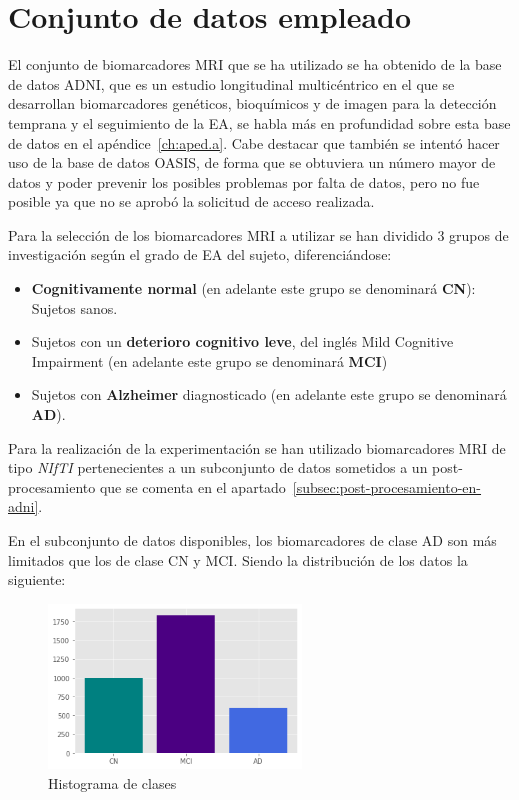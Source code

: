 \section{Conjunto de datos empleado}\label{sec:conjunto-de-datos-empleado}
El conjunto de biomarcadores MRI que se ha utilizado se ha obtenido de la base de datos ADNI, que es un estudio
longitudinal multicéntrico en el que se desarrollan biomarcadores genéticos, bioquímicos y de imagen para la detección
temprana y el seguimiento de la EA, se habla más en profundidad sobre esta base de datos en el
apéndice~\ref{ch:aped.a}.
Cabe destacar que también se intentó hacer uso de la base de datos OASIS, de forma que se obtuviera un número mayor de
datos y poder prevenir los posibles problemas por falta de datos, pero no fue posible ya que no se aprobó la solicitud
de acceso realizada.

Para la selección de los biomarcadores MRI a utilizar se han dividido 3 grupos de investigación según el grado de EA
del sujeto, diferenciándose:
\begin{itemize}
    \item \textbf{Cognitivamente normal} (en adelante este grupo se denominará \textbf{CN}): Sujetos sanos.
    \item Sujetos con un \textbf{deterioro cognitivo leve}, del inglés Mild Cognitive Impairment (en adelante este grupo
    se denominará \textbf{MCI})
    \item Sujetos con \textbf{Alzheimer} diagnosticado (en adelante este grupo se denominará \textbf{AD}). \\
\end{itemize}

Para la realización de la experimentación se han utilizado biomarcadores MRI de tipo \textit{NIfTI} pertenecientes a un
subconjunto de datos sometidos a un post-procesamiento que se comenta en el apartado~\ref{subsec:post-procesamiento-en-adni}.

En el subconjunto de datos disponibles, los biomarcadores de clase \Gls{AD} son más limitados que los de clase \Gls{CN} y \Gls{MCI}.
Siendo la distribución de los datos la siguiente:

\begin{figure}[H]
    \centering
    \includegraphics[width=0.6\textwidth]{./imgs/histograma-de-clases}
    \caption{Histograma de clases}
    \label{fig:histograma-de-clases}
\end{figure}

